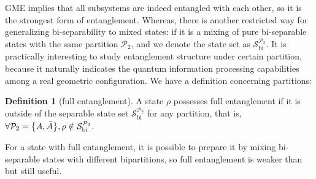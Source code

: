 \documentclass[
aps,
pra,
twocolumn,
floatfix,
]{revtex4-2}
\theoremstyle{plain}
\theoremstyle{definition}
\newtheorem{definition}{Definition}
\newtheorem{remark}{Remark}
\newcommand{\dm}{\rho}
\newcommand{\bi}{\text{bi}}
\newcommand{\separable}{\mathcal{S}}
\newcommand{\ppartition}{\mathcal{P}}
\begin{document}
GME implies that all subsystems are indeed entangled with each other,
so it is the strongest form of entanglement. 
Whereas, there is another restricted way for generalizing bi-separability to mixed states: 
if it is a mixing of pure bi-separable states with the same partition $\ppartition_2$, 
and we denote the state set as $\separable_{\bi}^{\ppartition_2}$. 
It is practically interesting to study entanglement structure under certain partition,
because it naturally indicates the quantum information processing capabilities among a real geometric configuration.
We have a definition concerning partitions:
\begin{definition}[full entanglement]\label{def:full_entanglement}
	A state $\dm$ possesses full entanglement
	if it is outside of the separable state set $\separable_{\bi}^{\ppartition_2}$ for any partition,
	that is, $\forall \ppartition_2 = \qty{A,\bar{A}},\dm \notin \separable_\bi^{\ppartition_2}$.
\end{definition}
For a state with full entanglement, it is possible to prepare it by mixing bi-separable states with different bipartitions,
so full entanglement is weaker than  but still useful.


\end{document}
